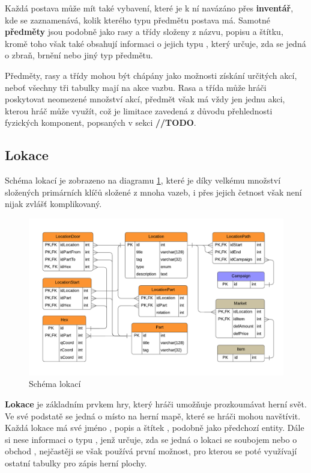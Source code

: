 Každá postava může mít také vybavení, které je k ní navázáno přes \textbf{inventář}, kde se zaznamenává, kolik kterého typu předmětu postava má. Samotné \textbf{předměty} jsou podobně jako rasy a třídy složeny z názvu, popisu a štítku, kromě toho však také obsahují informaci o jejich typu , který určuje, zda se jedná o zbraň, brnění nebo jiný typ předmětu.

Předměty, rasy a třídy mohou být chápány jako možnosti získání určitých akcí, neboť všechny tři tabulky mají na akce vazbu. Rasa a třída může hráči poskytovat neomezené množství akcí, předmět však má vždy jen jednu akci, kterou hráč může využít, což je limitace zavedená z důvodu přehlednosti fyzických komponent, popsaných v sekci \textbf{//TODO}.


\subsection{Lokace}
\label{subsec:schema_location}

Schéma lokací je zobrazeno na diagramu \ref{diag:er_location}, které je díky velkému množství složených primárních klíčů složené z mnoha vazeb, i přes jejich četnost však není nijak zvlášť komplikovaný.

\begin{figure}[h]
    \centering
    \includegraphics[scale=0.8]{../../shared/diagrams/er_location.pdf}
    \caption{Schéma lokací}
    \label{diag:er_location}
\end{figure}

\textbf{Lokace} je základním prvkem hry, který hráči umožňuje prozkoumávat herní svět. Ve své podstatě se jedná o místo na herní mapě, které se hráči mohou navštívit. Každá lokace má své jméno , popis  a štítek , podobně jako předchozí entity. Dále si nese informaci o typu , jenž určuje, zda se jedná o lokaci se soubojem  nebo o obchod , nejčastěji se však používá první možnost, pro kterou se poté využívají ostatní tabulky pro zápis herní plochy.

